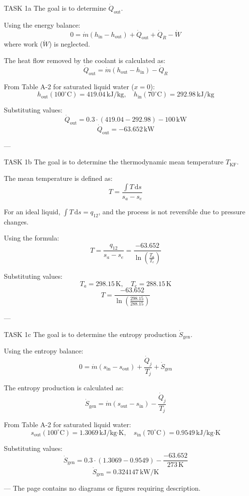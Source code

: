 TASK 1a  
The goal is to determine \( \dot{Q}_{\text{out}} \).  

Using the energy balance:  
\[
0 = \dot{m} (h_{\text{in}} - h_{\text{out}}) + \dot{Q}_{\text{out}} + \dot{Q}_R - \dot{W}
\]  
where work (\( \dot{W} \)) is neglected.  

The heat flow removed by the coolant is calculated as:  
\[
\dot{Q}_{\text{out}} = \dot{m} (h_{\text{out}} - h_{\text{in}}) - \dot{Q}_R
\]  

From Table A-2 for saturated liquid water (\( x = 0 \)):  
\[
h_{\text{out}}(100^\circ\text{C}) = 419.04 \, \text{kJ/kg}, \quad h_{\text{in}}(70^\circ\text{C}) = 292.98 \, \text{kJ/kg}
\]  

Substituting values:  
\[
\dot{Q}_{\text{out}} = 0.3 \cdot (419.04 - 292.98) - 100 \, \text{kW}
\]  
\[
\dot{Q}_{\text{out}} = -63.652 \, \text{kW}
\]  

---

TASK 1b  
The goal is to determine the thermodynamic mean temperature \( T_{\text{KF}} \).  

The mean temperature is defined as:  
\[
T = \frac{\int T \, \mathrm{d}s}{s_a - s_e}
\]  

For an ideal liquid, \( \int T \, \mathrm{d}s = q_{12} \), and the process is not reversible due to pressure changes.  

Using the formula:  
\[
T = \frac{q_{12}}{s_a - s_e} = \frac{-63.652}{\ln \left( \frac{T_a}{T_e} \right)}
\]  

Substituting values:  
\[
T_a = 298.15 \, \text{K}, \quad T_e = 288.15 \, \text{K}
\]  
\[
T = \frac{-63.652}{\ln \left( \frac{298.15}{288.15} \right)}
\]  

---

TASK 1c  
The goal is to determine the entropy production \( \dot{S}_{\text{gen}} \).  

Using the entropy balance:  
\[
0 = \dot{m} (s_{\text{in}} - s_{\text{out}}) + \frac{\dot{Q}_j}{T_j} + \dot{S}_{\text{gen}}
\]  

The entropy production is calculated as:  
\[
\dot{S}_{\text{gen}} = \dot{m} (s_{\text{out}} - s_{\text{in}}) - \frac{\dot{Q}_j}{T_j}
\]  

From Table A-2 for saturated liquid water:  
\[
s_{\text{out}}(100^\circ\text{C}) = 1.3069 \, \text{kJ/kg·K}, \quad s_{\text{in}}(70^\circ\text{C}) = 0.9549 \, \text{kJ/kg·K}
\]  

Substituting values:  
\[
\dot{S}_{\text{gen}} = 0.3 \cdot (1.3069 - 0.9549) - \frac{-63.652}{273 \, \text{K}}
\]  
\[
\dot{S}_{\text{gen}} = 0.324147 \, \text{kW/K}
\]  

---  
The page contains no diagrams or figures requiring description.